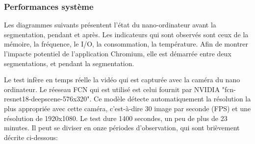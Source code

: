 \subsubsection{Performances système}
\par Les diagrammes suivants présentent l'état du nano-ordinateur avant la segmentation, pendant et après. Les indicateurs qui sont observés sont ceux de la mémoire, la fréquence, le I/O, la consommation, la température. Afin de montrer l'impacte potentiel de l'application Chromium, elle est démarrée entre deux segmentations, et pendant la segmentation. 
\par Le test infère en temps réelle la vidéo qui est capturée avec la caméra du nano ordinateur. Le réeseau FCN qui est utilisé est celui fournit par NVIDIA "fcn-resnet18-deepscene-576x320". Ce modèle détecte automatiquement la résolution la plus appropriée avec cette caméra, c'est-à-dire 30 image par seconde (FPS) et une résolution de 1920x1080. Le test dure 1400 secondes, un peu de plus de 23 minutes. Il peut se diviser en onze périodes d'observation, qui sont brièvement décrite ci-dessous: 
